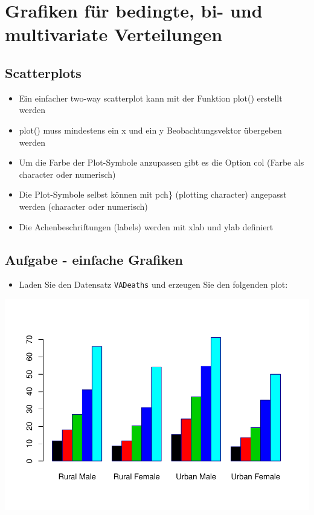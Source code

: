 \documentclass[]{article}
\providecommand{\tightlist}{%
  \setlength{\itemsep}{0pt}\setlength{\parskip}{0pt}}
\begin{document}
\section{Grafiken für bedingte, bi- und multivariate
Verteilungen}\label{grafiken-fur-bedingte-bi--und-multivariate-verteilungen}

\subsection{Scatterplots}\label{scatterplots}

\begin{itemize}
\tightlist
\item
  Ein einfacher two-way scatterplot kann mit der Funktion plot()
  erstellt werden
\item
  plot() muss mindestens ein x und ein y Beobachtungsvektor übergeben
  werden
\item
  Um die Farbe der Plot-Symbole anzupassen gibt es die Option col (Farbe
  als character oder numerisch)
\item
  Die Plot-Symbole selbst können mit pch\} (plotting character)
  angepasst werden (character oder numerisch)
\item
  Die Achenbeschriftungen (labels) werden mit xlab und ylab definiert
\end{itemize}

\subsection{Aufgabe - einfache
Grafiken}\label{aufgabe---einfache-grafiken}

\begin{itemize}
\tightlist
\item
  Laden Sie den Datensatz \texttt{VADeaths} und erzeugen Sie den
  folgenden plot:
\end{itemize}

\includegraphics{Intro_Datenanalyse1_files/figure-latex/unnamed-chunk-158-1.pdf}
\end{document}
